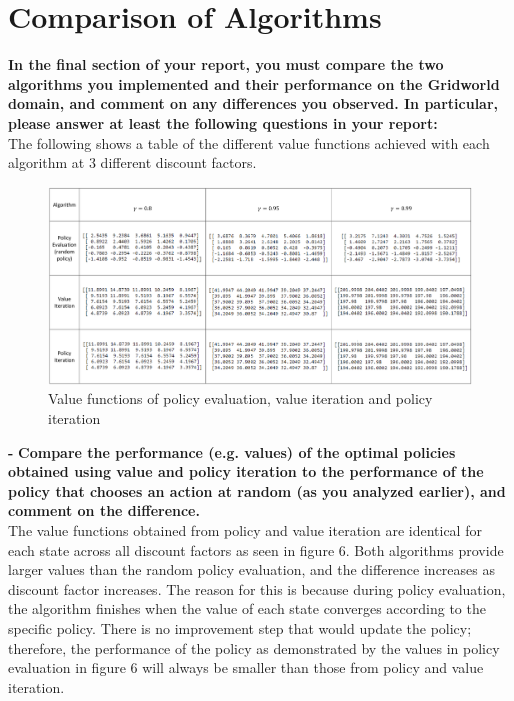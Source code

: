 \documentclass[11pt]{article}
\begin{document}
\newpage
\section{Comparison of Algorithms}
\textbf{In the final section of your report, you must compare the two algorithms you
implemented and their performance on the Gridworld domain, and comment on any
differences you observed. In particular, please answer at least the following
questions in your report:}
\\

\noindent
The following shows a table of the different value functions achieved with each algorithm at 
3 different discount factors.\\

\begin{figure}[h]
\includegraphics[scale=0.255]{value_functions}
\centering
\caption{Value functions of policy evaluation, value iteration and policy iteration}
\end{figure}

\noindent
\textbf{-}
\noindent
\textbf{Compare the performance (e.g. values) of the optimal policies obtained
using value and policy iteration to the performance of the policy that chooses
an action at random (as you analyzed earlier), and comment on the difference.}
\\

\noindent
The value functions obtained from policy and value iteration are identical for
each state across all discount factors as seen in figure 6. Both algorithms
provide larger values than the random policy evaluation, and the difference
increases as discount factor increases. The reason for this is because during
policy evaluation, the algorithm finishes when the value of each state converges
according to the specific policy. There is no improvement step that would update
the policy; therefore, the performance of the policy as demonstrated by the
values in policy evaluation in figure 6 will always be smaller than those from
policy and value iteration.\\
\end{document}
